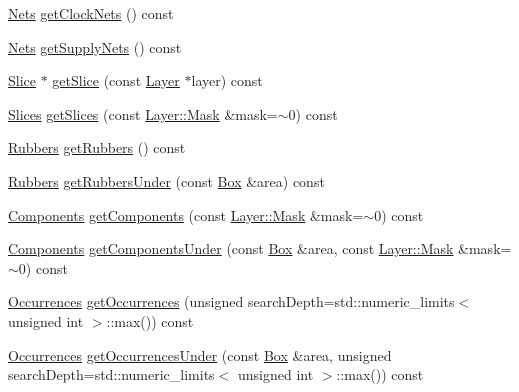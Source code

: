 \begin{DoxyCompactItemize}
\item 
\hyperlink{namespaceHurricane_a3404a8b17130a1824f4a281704b04df7}{Nets} \hyperlink{classHurricane_1_1Cell_a306f28990f9fd4ccee0e9e8ebecf98fc}{get\+Clock\+Nets} () const
\item 
\hyperlink{namespaceHurricane_a3404a8b17130a1824f4a281704b04df7}{Nets} \hyperlink{classHurricane_1_1Cell_ac51c8f16de7a4af86feead9f1aecf494}{get\+Supply\+Nets} () const
\item 
\hyperlink{classHurricane_1_1Slice}{Slice} $\ast$ \hyperlink{classHurricane_1_1Cell_ac438b5b6b8dbcd868d6bf0deeb469444}{get\+Slice} (const \hyperlink{classHurricane_1_1Layer}{Layer} $\ast$layer) const
\item 
\hyperlink{namespaceHurricane_aa4a7e8a563c5687621eb5e57ade1706a}{Slices} \hyperlink{classHurricane_1_1Cell_aba933a81e3cacfc05b7bd1660e2a933a}{get\+Slices} (const \hyperlink{classHurricane_1_1Layer_af5277c670637bd5d910237e7afe01a91}{Layer\+::\+Mask} \&mask=$\sim$0) const
\item 
\hyperlink{namespaceHurricane_af8923abd57508cc44931a00d61b564ad}{Rubbers} \hyperlink{classHurricane_1_1Cell_a56395a189898d5ae2a869d5a5d5dfdbe}{get\+Rubbers} () const
\item 
\hyperlink{namespaceHurricane_af8923abd57508cc44931a00d61b564ad}{Rubbers} \hyperlink{classHurricane_1_1Cell_a58c6e24401d15f375547ad95b5c2c27c}{get\+Rubbers\+Under} (const \hyperlink{classHurricane_1_1Box}{Box} \&area) const
\item 
\hyperlink{namespaceHurricane_a7d26d99aeb5dd6d70d51bd35d2473e72}{Components} \hyperlink{classHurricane_1_1Cell_a14cb1b1f27e75d4af5b34a9a5956d818}{get\+Components} (const \hyperlink{classHurricane_1_1Layer_af5277c670637bd5d910237e7afe01a91}{Layer\+::\+Mask} \&mask=$\sim$0) const
\item 
\hyperlink{namespaceHurricane_a7d26d99aeb5dd6d70d51bd35d2473e72}{Components} \hyperlink{classHurricane_1_1Cell_a0a3c54d755ab36fe74bd032dfd43b53a}{get\+Components\+Under} (const \hyperlink{classHurricane_1_1Box}{Box} \&area, const \hyperlink{classHurricane_1_1Layer_af5277c670637bd5d910237e7afe01a91}{Layer\+::\+Mask} \&mask=$\sim$0) const
\item 
\hyperlink{namespaceHurricane_a1912927c128eee859af62dbe4cbe0a6b}{Occurrences} \hyperlink{classHurricane_1_1Cell_ab5bbab0a59106855d61deb94805e6115}{get\+Occurrences} (unsigned search\+Depth=std\+::numeric\+\_\+limits$<$ unsigned int $>$\+::max()) const
\item 
\hyperlink{namespaceHurricane_a1912927c128eee859af62dbe4cbe0a6b}{Occurrences} \hyperlink{classHurricane_1_1Cell_a7fb09c8e350923c47ce4c4407bdb00ce}{get\+Occurrences\+Under} (const \hyperlink{classHurricane_1_1Box}{Box} \&area, unsigned search\+Depth=std\+::numeric\+\_\+limits$<$ unsigned int $>$\+::max()) const

\end{DoxyCompactItemize}
